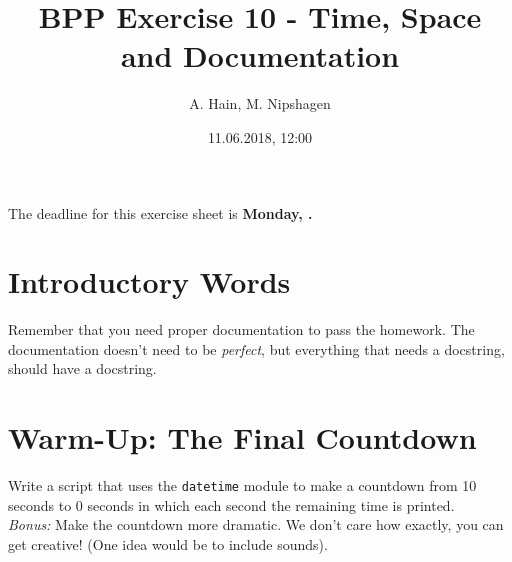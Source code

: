
\usepackage{setspace}

\title{BPP Exercise 10 - Time, Space and Documentation}
\author{A. Hain, M. Nipshagen}
\date{11.06.2018, 12:00}


\makeatletter
\let\thetitle\@title
\let\theauthor\@author
\let\thedate\@date
\makeatother


\newcommand\itemsub[1]{
	\begin{itemize}
		\item #1
	\end{itemize}
}





The deadline for this exercise sheet is \textbf{Monday, \thedate.}

\section*{Introductory Words}
Remember that you need proper documentation to pass
the homework. The documentation doesn't need to be \textit{perfect}, but
everything that needs a docstring, should have a docstring.

\section{Warm-Up: The Final Countdown}
Write a script that uses the \texttt{datetime} module to make a countdown from
10 seconds to 0 seconds in which each second the remaining time is printed.\\
\textit{Bonus: } Make the countdown more dramatic. We don't care how exactly,
you can get creative! (One idea would be to include sounds).


